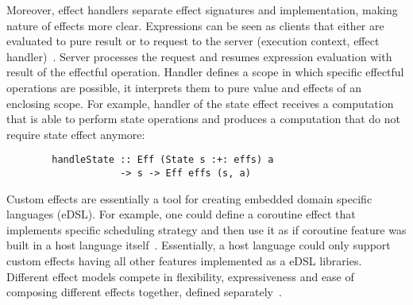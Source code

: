 \documentclass[conference]{IEEEtran}
\begin{document}
%

    Moreover, effect handlers separate effect signatures and implementation, making nature of effects more clear.
    Expressions can be seen as clients that either are evaluated to pure result or to request to the server (execution context, effect handler)~\cite{kiselyov2013extensible}.
    Server processes the request and resumes expression evaluation with result of the effectful operation.
    Handler defines a scope in which specific effectful operations are possible, it interprets them to pure value and effects of an enclosing scope.
    For example, handler of the state effect receives a computation that is able to perform state operations and produces a computation that do not require state effect anymore:
    \begin{verbatim}
        handleState :: Eff (State s :+: effs) a
                    -> s -> Eff effs (s, a)
    \end{verbatim}

    Custom effects are essentially a tool for creating embedded domain specific languages (eDSL).
    For example, one could define a coroutine effect that implements specific scheduling strategy and then use it as if coroutine feature was built in a host language itself~\cite{leijen2017structured}.
    Essentially, a host language could only support custom effects having all other features implemented as a eDSL libraries.
    Different effect models compete in flexibility, expressiveness and ease of composing different effects together, defined separately~\cite{liang1995monad, kiselyov2013extensible, schrijvers2019monad, van2024framework}.
\end{document}
